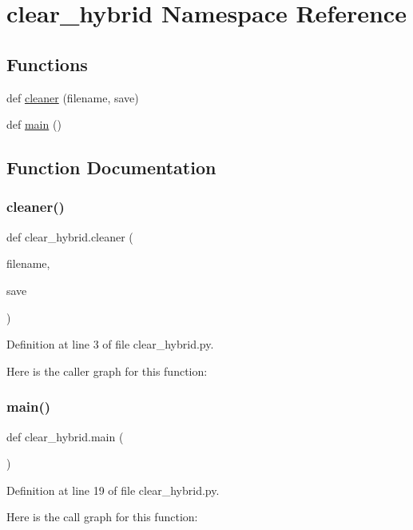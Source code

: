 \hypertarget{namespaceclear__hybrid}{}\section{clear\+\_\+hybrid Namespace Reference}
\label{namespaceclear__hybrid}
\subsection*{Functions}
\begin{DoxyCompactItemize}
\item 
def \hyperlink{namespaceclear__hybrid_ada5d546b10188d7aac3b703aca66ac4d}{cleaner} (filename, save)
\item 
def \hyperlink{namespaceclear__hybrid_a6d65384ce7daead4a58be74548968cbf}{main} ()
\end{DoxyCompactItemize}


\subsection{Function Documentation}
\mbox{\label{namespaceclear__hybrid_ada5d546b10188d7aac3b703aca66ac4d}} 
\subsubsection{\texorpdfstring{cleaner()}{cleaner()}}
{\footnotesize\ttfamily def clear\+\_\+hybrid.\+cleaner (\begin{DoxyParamCaption}\item[{}]{filename,  }\item[{}]{save }\end{DoxyParamCaption})}



Definition at line 3 of file clear\+\_\+hybrid.\+py.

Here is the caller graph for this function\+:
\mbox{\label{namespaceclear__hybrid_a6d65384ce7daead4a58be74548968cbf}} 
\subsubsection{\texorpdfstring{main()}{main()}}
{\footnotesize\ttfamily def clear\+\_\+hybrid.\+main (\begin{DoxyParamCaption}{ }\end{DoxyParamCaption})}



Definition at line 19 of file clear\+\_\+hybrid.\+py.

Here is the call graph for this function\+:
